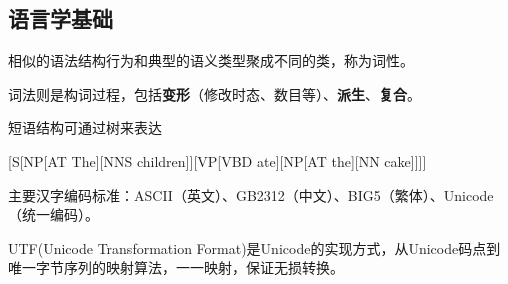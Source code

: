 \subsection{语言学基础}
\begin{definition}
相似的语法结构行为和典型的语义类型聚成不同的类，称为词性。
\end{definition}
\begin{definition}[词法]
词法则是构词过程，包括\textbf{变形}（修改时态、数目等）、\textbf{派生}、\textbf{复合}。
\end{definition}

短语结构可通过树来表达
\begin{center}
[S[NP[AT The][NNS children]][VP[VBD ate][NP[AT the][NN cake]]]]
\end{center}

主要汉字编码标准：ASCII（英文）、GB2312（中文）、BIG5（繁体）、Unicode（统一编码）。

UTF(Unicode Transformation Format)是Unicode的实现方式，从Unicode码点到唯一字节序列的映射算法，一一映射，保证无损转换。